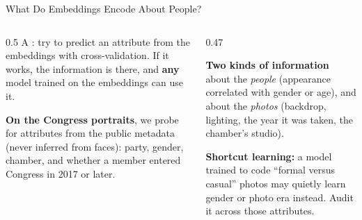 \begin{frame}{What Do Embeddings Encode About People?}
\begin{columns}[T]
\begin{column}{0.5\textwidth}
A : try to predict an attribute from the embeddings with cross-validation. If it
works, the information is there, and \textbf{any} model trained on the embeddings can use it.

\vspace{0.2cm}
\textbf{On the Congress portraits}, we probe for attributes from the public metadata (never
inferred from faces): party, gender, chamber, and whether a member entered Congress in 2017 or
later.
\end{column}
\begin{column}{0.47\textwidth}
\begin{graybox}
\textbf{Two kinds of information}\\
about the \emph{people} (appearance correlated with gender or age), and about the \emph{photos}
(backdrop, lighting, the year it was taken, the chamber's studio).
\end{graybox}
\begin{warnbox}
\textbf{Shortcut learning:} a model trained to code ``formal versus casual'' photos may quietly
learn gender or photo era instead. Audit it across those attributes.
\end{warnbox}
\end{column}
\end{columns}
\end{frame}

